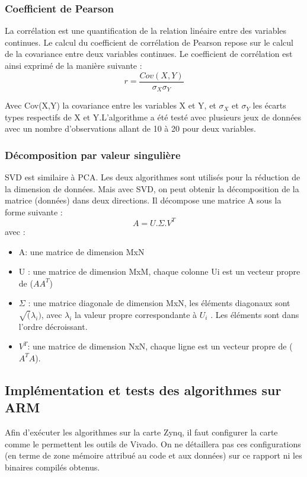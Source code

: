 \documentclass[12pt,a4paper]{article}
\begin{document}
\subsubsection{Coefficient de Pearson}
La corrélation est une quantification de la relation linéaire entre des variables continues. Le calcul du coefficient de corrélation de Pearson repose sur le calcul de la covariance entre deux variables continues. 
Le coefficient de corrélation est ainsi exprimé de la manière suivante :
$$ r = \dfrac{Cov(X,Y)}{\sigma _X \sigma _Y}$$

Avec Cov(X,Y) la covariance entre les variables X et Y, et $\sigma _X$ et $\sigma _Y$ les écarts types respectifs de X et Y.L’algorithme a été testé avec plusieurs jeux de données avec un nombre d’observations allant de 10 à 20 pour deux variables.
\subsubsection{Décomposition par valeur singulière}
SVD est similaire à PCA.  Les deux algorithmes sont utilisés pour la réduction de la dimension de données. Mais avec SVD, on peut obtenir la décomposition de la matrice (données) dans deux directions. Il décompose une matrice A sous la forme suivante :
$$ A = U . \Sigma . V^T$$ 
avec :
\begin{itemize}
\item A: une matrice de dimension MxN
\item U : une matrice de dimension MxM, chaque colonne Ui est un vecteur propre de ($AA^T$)
\item $\Sigma$ : une matrice diagonale de dimension MxN, les éléments diagonaux sont $\sqrt (\lambda_i)$, avec $\lambda_i$ la valeur propre correspondante à $U_i$ . Les éléments sont dans l’ordre décroissant.
\item $V^T$: une matrice de dimension NxN, chaque ligne est un vecteur propre de ($A^TA$).
\end{itemize} 

\subsection{Implémentation et tests des algorithmes sur ARM}
Afin d'exécuter les algorithmes sur la carte Zynq, il faut configurer la carte comme le permettent les outils de Vivado. On ne détaillera pas ces configurations (en terme de zone mémoire attribué au code et aux données) sur ce rapport ni les binaires compilés obtenus.
\end{document}
